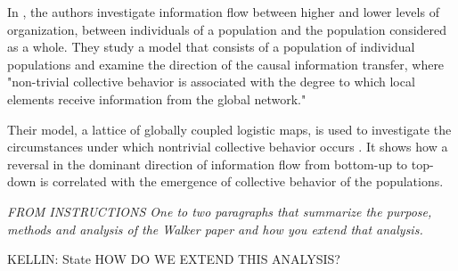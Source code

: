 \documentclass[conference]{IEEEtran}
\begin{document}
In \cite{Walker}, the authors investigate information flow between higher and lower levels of organization, between individuals of a population and the population considered as a whole. 
They study a model that consists of a population of individual populations and examine the direction of the causal information transfer, where 
"non-trivial collective behavior is associated with the degree to which local elements receive information from the global network." \cite{Walker}

Their model, a lattice of  globally coupled logistic maps, is used to investigate the circumstances under which nontrivial collective behavior occurs . It shows how a reversal in the dominant direction of information flow from bottom-up to top-down is correlated with the emergence of collective behavior of the populations.  

{\it FROM INSTRUCTIONS One to two paragraphs that summarize the purpose, methods and analysis of the Walker paper and how you extend that analysis. }


KELLIN:  State HOW DO WE EXTEND THIS ANALYSIS?  






%
%
\end{document}
